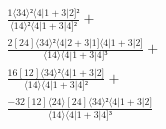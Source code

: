 \documentclass[varwidth, border=5pt]{standalone}
\begin{document}
\begin{my}
$\begin{gathered}
\scriptscriptstyle\frac{1⟨34⟩²⟨4|1+3|2]²}{⟨14⟩²⟨4|1+3|4]²} +\\
\scriptscriptstyle\frac{2[24]⟨34⟩²⟨4|2+3|1]⟨4|1+3|2]}{⟨14⟩⟨4|1+3|4]³} +\\
\scriptscriptstyle\frac{16[12]⟨34⟩²⟨4|1+3|2]}{⟨14⟩⟨4|1+3|4]²} +\\
\scriptscriptstyle\frac{-32[12]⟨24⟩[24]⟨34⟩²⟨4|1+3|2]}{⟨14⟩⟨4|1+3|4]³} \phantom{+}
\end{gathered}$
\end{my}
\end{document}

